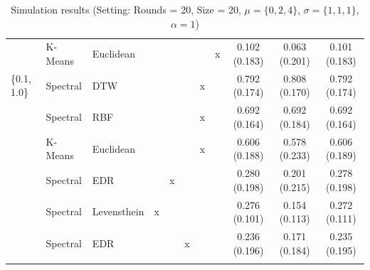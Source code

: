 \documentclass[12pt,a4paper,bibliography=totocnumbered,listof=totocnumbered]{scrartcl}
\begin{document}
{\begin{appendix}
\begin{table}[H]
\begin{tabularx}{\textwidth}{ lllcccccccc}
		& K-Means & Euclidean  &  &  &  &  & x & 0.102 (0.183) & 0.063 (0.201) & 0.101 (0.183) \\ 
		\{0.1, 1.0\} & Spectral  & DTW &  &  &  & x &  & 0.792 (0.174) & 0.808 (0.170) & 0.792 (0.174) \\ 
		& Spectral  & RBF &  &  &  & x &  & 0.692 (0.164) & 0.692 (0.184) & 0.692 (0.164) \\ 
		& K-Means & Euclidean  &  &  &  & x &  & 0.606 (0.188) & 0.578 (0.233) & 0.606 (0.189) \\ 
		& Spectral  & EDR &  & x &  &  &  & 0.280 (0.198) & 0.201 (0.215) & 0.278 (0.198) \\ 
		& Spectral  & Levensthein & x &  &  &  &  & 0.276 (0.101) & 0.154 (0.113) & 0.272 (0.111) \\ 
		& Spectral  & EDR &  &  & x &  &  & 0.236 (0.196) & 0.171 (0.184) & 0.235 (0.195) \\ 
		\hline \\[-1.8ex] 
	\end{tabularx} 
	\caption{Simulation results (Setting: Rounds = 20, Size = 20, $\mu = \{0,2,4\}$, $\sigma =  \{1,1,1\}$, $\alpha = 1$)} 
		\label{tab:apstab3}
\end{table} 




\end{appendix}}
\end{document}
